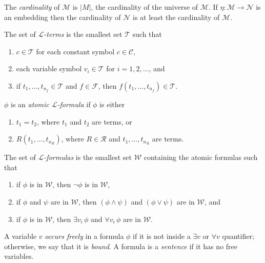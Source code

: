 \documentclass[
	fontsize=10pt, %
]{kaohandt}
\begin{document}
The \emph{cardinality} of $\mathcal{M}$ is $|M|$,
the cardinality of the universe of $\mathcal{M}$.
If $\eta: \mathcal{M} \to \mathcal{N}$ is an embedding then 
the cardinality of $\mathcal{N}$ is at least the cardinality of $\mathcal{M}$.

\begin{definition}
    The set of \emph{$\mathcal{L}$-terms} is the smallest set $\mathcal{T}$ such that
    \begin{enumerate}[label = {(\roman*)}]
        \item $c\in \mathcal{T}$ for each constant symbol $c \in \mathcal{C}$,
        \item each variable symbol $v_i \in \mathcal{T}$ for $i = 1,2,\dots$, and
        \item if $t_1,\dots,t_{n_f} \in \mathcal{T}$ and $f \in \mathcal{F}$, then $f(t_1,\dots,t_{n_f}) \in \mathcal{T}$.
    \end{enumerate}
\end{definition}

\begin{definition}
    $\phi$ is an \emph{atomic $\mathcal{L}$-formula} if $\phi$ is either
    \begin{enumerate}[label= {\roman*)}]
        \item $t_1 = t_2$, where $t_1$ and $t_2$ are terms, or
        \item $R(t_1,\dots,t_{n_R})$, where $R \in \mathcal{R}$ and $t_1,\dots,t_{n_R}$ are terms.
    \end{enumerate}
    The set of \emph{$\mathcal{L}$-formulas} is the smallest set $\mathcal{W}$ containing the atomic formulas such that 
    \begin{enumerate}[label= {\roman*)}]
        \item if $\phi$ is in $\mathcal{W}$, then $\neg\phi$ is in $\mathcal{W}$,
        \item if $\phi$ and $\psi$ are in $\mathcal{W}$, then $(\phi \land \psi)$ and $(\phi \lor \psi)$ are in $\mathcal{W}$, and 
        \item if $\phi$ is in $\mathcal{W}$, then $\exists v_i\, \phi$ and $\forall v_i\, \phi$ are in $\mathcal{W}$.
    \end{enumerate}
\end{definition}

A variable $v$ \emph{occurs freely} in a formula $\phi$
if it is not inside a $\exists v$ or $\forall v$ quantifier;
otherwise, we say that it is \emph{bound}.
A formula is a \emph{sentence} if it has no free variables.
\end{document}
